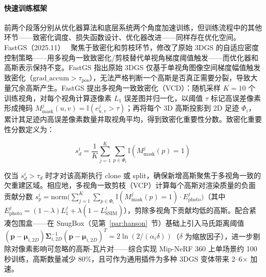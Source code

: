 \paragraph{快速训练框架}

前两个段落分别从优化器算法和底层系统两个角度加速训练，但训练流程中的其他环节——致密化调度、损失函数设计、优化器改进——同样存在优化空间。FastGS（2025.11）~\cite{2511_04283} 聚焦于致密化和剪枝环节，修改了原始 3DGS 的自适应密度控制策略——用多视角一致致密化/剪枝替代单视角梯度阈值触发——而优化器和高斯表示保持不变。FastGS 指出原始 3DGS 仅基于单视角图像空间梯度幅值触发致密化（$\text{grad\_accum} > \tau_{\text{pos}}$），无法严格判断一个高斯是否真正需要分裂，导致大量冗余高斯产生。FastGS 提出多视角一致致密化（VCD）：随机采样 $K{=}10$ 个训练视角，对每个视角计算逐像素 $L_1$ 误差图并归一化，以阈值 $\tau$ 标记高误差像素形成掩码 $M^j_{\text{mask}}(u,v) = \mathbb{I}(e^j_{u,v} > \tau)$；再将每个 3D 高斯投影到 2D 足迹 $\Phi_i$，累计其足迹内高误差像素数量并取视角平均，得到致密化重要性分数。致密化重要性分数定义为：

\begin{equation}
s^i_d = \frac{1}{K}\sum_{j=1}^{K} \sum_{p \in \Phi_i} \mathbb{I}(M^j_{\text{mask}}(p) = 1)
\end{equation}

仅当 $s^i_d > \tau_d$ 时才对该高斯执行 clone 或 split，确保新增高斯聚焦于多视角一致的欠重建区域。相应地，多视角一致剪枝（VCP）计算每个高斯对渲染质量的负面贡献分数 $s^i_p = \text{norm}\big(\sum_{j=1}^{K} \sum_{p \in \Phi_i} \mathbb{I}(M^j_{\text{mask}}(p) = 1) \cdot E^j_{\text{photo}}\big)$（其中 $E^j_{\text{photo}} = (1{-}\lambda)L^j_1 + \lambda(1{-}L^j_{\text{SSIM}})$），剪除多视角下贡献均低的高斯。配合紧凑包围盒——在 SnugBox（见第~\ref{par:hanson}~节）基础上引入马氏距离阈值 $(\mathbf{p} {-} \boldsymbol{\mu}_{i,2D})\boldsymbol{\Sigma}_{i,2D}^{-1}(\mathbf{p} {-} \boldsymbol{\mu}_{i,2D})^T = 2\ln(2/(\alpha_i \delta))$（$\delta$ 为缩放因子），进一步剔除对像素影响可忽略的高斯-瓦片对——综合实现 Mip-NeRF 360 上单场景约 100 秒训练，高斯数量减少 80\%，且可作为通用插件为多种 3DGS 变体带来 2--6$\times$ 加速。


